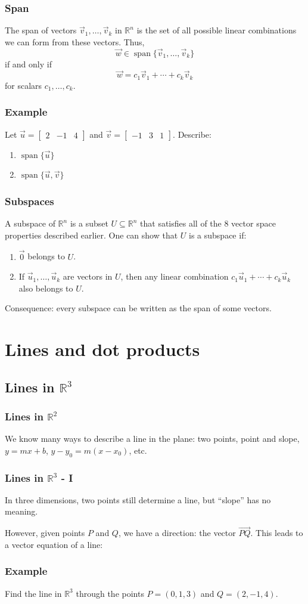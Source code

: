 \documentclass[11pt,t]{beamer}
\DeclareMathOperator{\spn}{span}
\newcommand{\R}{\mathbb{R}}
\begin{document}
\begin{frame}\frametitle{Span}
 The \alert{span} of vectors $\vec{v}_1,\ldots, \vec{v}_k$ in $\R^n$ is the set of all possible linear combinations we can form from these vectors. Thus,
\[
 \vec{w}\in\spn\{\vec{v}_1,\ldots, \vec{v}_k\}
\]
if and only if
\[
 \vec{w} = c_1\vec{v}_1+\cdots + c_k\vec{v}_k
\]
for scalars $c_1,\ldots, c_k$.
\end{frame}
\begin{frame}\frametitle{Example}
Let $\vec{u} = \begin{bmatrix}2&-1&4\end{bmatrix}$ and $\vec{v} = \begin{bmatrix}-1&3&1\end{bmatrix}$. Describe:
\begin{enumerate}
 \item $\spn\{\vec{u}\}$
 \item $\spn\{\vec{u},\vec{v}\}$
\end{enumerate}
 
\end{frame}
\begin{frame}\frametitle{Subspaces}
 A \alert{subspace} of $\R^n$ is a subset $U\subseteq \R^n$ that satisfies all of the 8 vector space properties described earlier. One can show that $U$ is a subspace if:
\begin{enumerate}
 \item $\vec{0}$ belongs to $U$.
 \item If $\vec{u}_1,\ldots, \vec{u}_k$ are vectors in $U$, then any linear combination $c_1\vec{u}_1+\cdots + c_k\vec{u}_k$ also belongs to $U$.
\end{enumerate}
 Consequence: every subspace can be written as the span of some vectors.
\end{frame}

\section{Lines and dot products}
\subsection{Lines in $\R^3$}
\begin{frame}\frametitle{Lines in $\R^2$}
 We know many ways to describe a line in the plane: two points, point and slope, $y=mx+b$, $y-y_0 = m(x-x_0)$, etc.
\end{frame}
\begin{frame}\frametitle{Lines in $\R^3$ - I}
 In three dimensions, two points still determine a line, but ``slope'' has no meaning.

 However, given points $P$ and $Q$, we have a \alert{direction}: the vector $\overrightarrow{PQ}$. This leads to a \alert{vector equation} of a line:
\end{frame}
\begin{frame}\frametitle{Example}
 Find the line in $\R^3$ through the points $P=(0,1,3)$ and $Q=(2,-1,4)$.
\end{frame}
\end{document}
